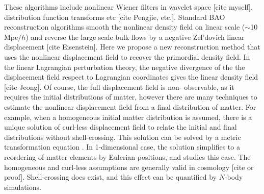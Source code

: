 \documentclass[aps,prd,twocolumn,superscriptaddress,amsfont,amssymb,amsmath,nofootinbib,showpacs,balancelastpage]{revtex4-1}
\begin{document}
These algorithms include nonlinear Wiener filters in wavelet space [cite myself], distribution 
function transforms etc [cite Pengjie, etc.]. Standard BAO reconstruction algorithms smooth the 
nonlinear density field on linear scale ($\sim$10 Mpc$/h$) and reverse the large 
scale bulk flows by a negative Zel'dovich linear displacement [cite Eisenstein]. Here we propose a 
new reconstruction method that uses the nonlinear displacement field to recover the 
primordial density field. In the linear Lagrangian perturbation theory, the 
negative divergence of the the displacement field respect to Lagrangian coordinates 
gives the linear density field [cite Jeong]. Of course, the full displacement field is non-
observable, as it requires the initial distributions of matter, however there are 
many techniques to estimate the nonlinear displacement field from a final 
distribution of matter. For example, when a homogeneous initial matter distribution 
is assumed, there is a unique solution of curl-less displacement field to relate 
the initial and final distributions without shell-crossing. This solution can be 
solved by a metric transformation equation \citep{1995ApJS..100..269P,1998ApJS..115...19P}. In 1-dimensional case, the solution simplifies to a reordering of 
matter elements by Eulerian positions, and \cite{2016arXiv160907041Z} studies this 
case. The homogeneous and curl-less assumptions are generally valid in cosmology 
[cite or proof]. Shell-crossing does exist, and this effect can be quantified by 
$N$-body simulations.
\end{document}
